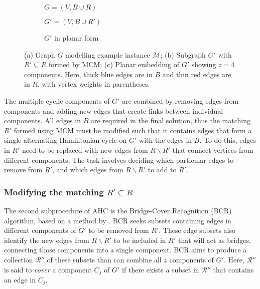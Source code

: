 \documentclass[authoryear]{elsarticle}
\begin{document}
\begin{figure}[H]	
	\centering
	\begin{subfigure}[h]{0.33\textwidth}
		
		\vspace{-2mm}
		\caption{$G = (V, B \cup R)$}
		\label{fig:threshold}
	\end{subfigure} \hspace{5mm}
	\begin{subfigure}[h]{0.33\textwidth}
		
		\vspace{-2mm}
		\caption{$G' = (V, B \cup R')$}
		\label{fig:matching}
	\end{subfigure} \hspace{7mm}
	\begin{subfigure}[h]{0.2\textwidth}
		
		\caption{$G'$ in planar form}
		\label{fig:mps}
	\end{subfigure}
	\caption{(a) Graph $G$ modelling example instance $\mathcal{M}$; (b) Subgraph $G'$ with $R' \subseteq R$ formed by MCM; (c) Planar embedding of $G'$ showing $z = 4$ components. Here, thick blue edges are in $B$ and thin red edges are in $R$, with vertex weights in parentheses.}
	\label{fig:mcm}
\end{figure}


\noindent The multiple cyclic components of $G'$ are combined by removing edges from components and adding new edges that create links between individual components. All edges in $B$ are required in the final solution, thus the matching $R'$ formed using MCM must be modified such that it contains edges that form a single alternating Hamliltonian cycle on $G'$ with the edges in $B$. To do this, edges in $R'$ need to be replaced with new edges from $R \backslash R'$ that connect vertices from different components. The task involves deciding which particular edges to remove from $R'$, and which edges from $R \backslash R'$ to add to $R'$.

\subsubsection{Modifying the matching $R' \subseteq R$}
\label{subsub:bcr}
\noindent The second subprocedure of AHC is the Bridge-Cover Recognition (BCR) algorithm, based on a method by \citet{becker2010}. BCR seeks subsets containing edges in different components of $G'$ to be removed from $R'$. These edge subsets also identify the new edges from $R \backslash R'$ to be included in $R'$ that will act as bridges, connecting those components into a single component. BCR aims to produce a collection $\mathcal{R}''$ of these subsets than can combine all $z$ components of $G'$. Here, $\mathcal{R}''$ is said to \emph{cover} a component $C_j$ of $G'$ if there exists a subset in $\mathcal{R}''$ that contains an edge in $C_j$.
\end{document}
